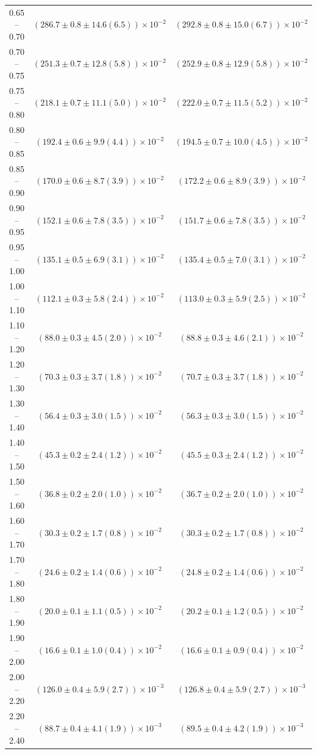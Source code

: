 \begin{table}
\begin{center}
\begin{tabular}{ c | c c }
0.65 -- 0.70 & $(286.7\pm0.8\pm14.6(6.5))\times10^{-2}$ & $(292.8\pm0.8\pm15.0(6.7))\times10^{-2}$ \\ 
0.70 -- 0.75 & $(251.3\pm0.7\pm12.8(5.8))\times10^{-2}$ & $(252.9\pm0.8\pm12.9(5.8))\times10^{-2}$ \\ 
0.75 -- 0.80 & $(218.1\pm0.7\pm11.1(5.0))\times10^{-2}$ & $(222.0\pm0.7\pm11.5(5.2))\times10^{-2}$ \\ 
0.80 -- 0.85 & $(192.4\pm0.6\pm9.9(4.4))\times10^{-2}$ & $(194.5\pm0.7\pm10.0(4.5))\times10^{-2}$ \\ 
0.85 -- 0.90 & $(170.0\pm0.6\pm8.7(3.9))\times10^{-2}$ & $(172.2\pm0.6\pm8.9(3.9))\times10^{-2}$ \\ 
0.90 -- 0.95 & $(152.1\pm0.6\pm7.8(3.5))\times10^{-2}$ & $(151.7\pm0.6\pm7.8(3.5))\times10^{-2}$ \\ 
0.95 -- 1.00 & $(135.1\pm0.5\pm6.9(3.1))\times10^{-2}$ & $(135.4\pm0.5\pm7.0(3.1))\times10^{-2}$ \\ 
1.00 -- 1.10 & $(112.1\pm0.3\pm5.8(2.4))\times10^{-2}$ & $(113.0\pm0.3\pm5.9(2.5))\times10^{-2}$ \\ 
1.10 -- 1.20 & $(88.0\pm0.3\pm4.5(2.0))\times10^{-2}$ & $(88.8\pm0.3\pm4.6(2.1))\times10^{-2}$ \\ 
1.20 -- 1.30 & $(70.3\pm0.3\pm3.7(1.8))\times10^{-2}$ & $(70.7\pm0.3\pm3.7(1.8))\times10^{-2}$ \\ 
1.30 -- 1.40 & $(56.4\pm0.3\pm3.0(1.5))\times10^{-2}$ & $(56.3\pm0.3\pm3.0(1.5))\times10^{-2}$ \\ 
1.40 -- 1.50 & $(45.3\pm0.2\pm2.4(1.2))\times10^{-2}$ & $(45.5\pm0.3\pm2.4(1.2))\times10^{-2}$ \\ 
1.50 -- 1.60 & $(36.8\pm0.2\pm2.0(1.0))\times10^{-2}$ & $(36.7\pm0.2\pm2.0(1.0))\times10^{-2}$ \\ 
1.60 -- 1.70 & $(30.3\pm0.2\pm1.7(0.8))\times10^{-2}$ & $(30.3\pm0.2\pm1.7(0.8))\times10^{-2}$ \\ 
1.70 -- 1.80 & $(24.6\pm0.2\pm1.4(0.6))\times10^{-2}$ & $(24.8\pm0.2\pm1.4(0.6))\times10^{-2}$ \\ 
1.80 -- 1.90 & $(20.0\pm0.1\pm1.1(0.5))\times10^{-2}$ & $(20.2\pm0.1\pm1.2(0.5))\times10^{-2}$ \\ 
1.90 -- 2.00 & $(16.6\pm0.1\pm1.0(0.4))\times10^{-2}$ & $(16.6\pm0.1\pm0.9(0.4))\times10^{-2}$ \\ 
2.00 -- 2.20 & $(126.0\pm0.4\pm5.9(2.7))\times10^{-3}$ & $(126.8\pm0.4\pm5.9(2.7))\times10^{-3}$ \\ 
2.20 -- 2.40 & $(88.7\pm0.4\pm4.1(1.9))\times10^{-3}$ & $(89.5\pm0.4\pm4.2(1.9))\times10^{-3}$ \\ 

\end{tabular}
\end{center}
\end{table}
